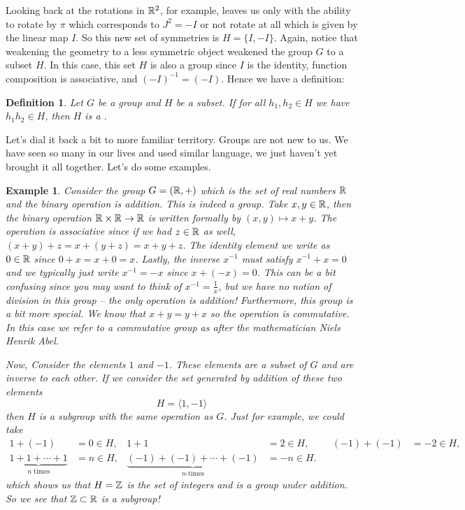 \documentclass{article}
\theoremstyle{indented}
\newtheorem{definition}{Definition}
\newtheorem{example}{Example}
\begin{document}
Looking back at the rotations in $\mathbb{R}^2$, for example, leaves us only with the ability to rotate by $\pi$ which corresponds to $J^2=-I$ or not rotate at all which is given by the linear map $I$. So this new set of symmetries is $H=\{I,-I\}$. Again, notice that weakening the geometry to a less symmetric object weakened the group $G$ to a subset $H$. In this case, this set $H$ is also a group since $I$ is the identity, function composition is associative, and $(-I)^{-1}=(-I)$. Hence we have a definition:

\begin{definition}
Let $G$ be a group and $H$ be a subset. If for all $h_1,h_2 \in H$ we have $h_1h_2 \in H$, then $H$ is a .
\end{definition}

Let's dial it back a bit to more familiar territory. Groups are not new to us. We have seen so many in our lives and used similar language, we just haven't yet brought it all together. Let's do some examples.

\begin{example}
Consider the group $G=(\mathbb{R},+)$ which is the set of real numbers $\mathbb{R}$ and the binary operation is addition. This is indeed a group. Take $x,y\in \mathbb{R}$, then the binary operation $\mathbb{R} \times \mathbb{R} \to \mathbb{R}$ is written formally by $(x,y)\mapsto x+y$. The operation is associative since if we had $z\in \mathbb{R}$ as well, $(x+y)+z=x+(y+z) = x+y+z$. The identity element we write as $0\in \mathbb{R}$ since $0+x=x+0=x$. Lastly, the inverse $x^{-1}$ must satisfy $x^{-1}+x=0$ and we typically just write $x^{-1}=-x$ since $x+(-x)=0$. This can be a bit confusing since you may want to think of $x^{-1}=\frac{1}{x}$, but we have no notion of division in this group -- the only operation is addition! Furthermore, this group is a bit more special. We know that $x+y=y+x$ so the operation is commutative. In this case we refer to a commutative group as  after the mathematician Niels Henrik Abel.

Now, Consider the elements $1$ and $-1$. These elements are a subset of $G$ and are inverse to each other. If we consider the set generated by addition of these two elements
\[
H = \langle 1,-1 \rangle
\]
then $H$ is a subgroup with the same operation as $G$. Just for example, we could take
\begin{align*}
1+(-1)&=0\in H, & 1+1&=2 \in H, && (-1)+(-1)&=-2 \in H,\\
\underbrace{1+1+\cdots+1}_{\textrm{$n$ times}} &= n \in H, & \underbrace{(-1)+(-1)+\cdots + (-1)}_{\textrm{$n$-times}} &= -n \in H.
\end{align*}
which shows us that $H=\mathbb{Z}$ is the set of integers and is a group under addition. So we see that $\mathbb{Z} \subset \mathbb{R}$ is a subgroup!
\end{example}
\end{document}
